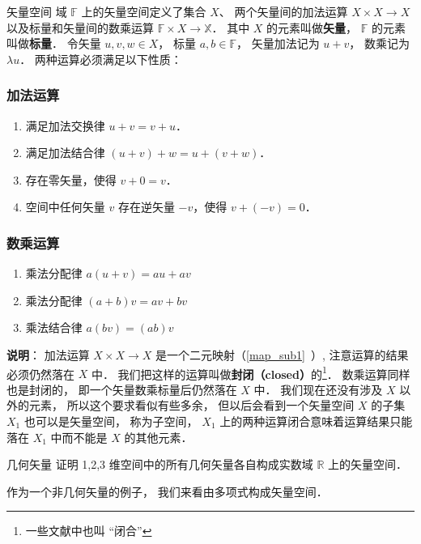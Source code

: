 \begin{definition}{矢量空间}
域 $\mathbb F$ 上的矢量空间定义了集合 $X$、 两个矢量间的加法运算 $X\times X \to X$ 以及标量和矢量间的数乘运算 $\mathbb F \times X \to \mathbb X$． 其中 $X$ 的元素叫做\textbf{矢量}， $\mathbb F$ 的元素叫做\textbf{标量}． 令矢量 $u,v,w \in X$， 标量 $a,b \in \mathbb F$， 矢量加法记为 $u + v$， 数乘记为 $\lambda u$． 两种运算必须满足以下性质：

\subsubsection{加法运算}
\begin{enumerate}
\item 满足加法交换律 $u + v = v + u$．
\item 满足加法结合律 $(u + v) + w = u + (v + w)$．
\item 存在零矢量，使得 $v + 0 = v$．
\item 空间中任何矢量 $v$ 存在逆矢量 $-v$，使得 $v + (-v) = 0$．
\end{enumerate}

\subsubsection{数乘运算}
\begin{enumerate}
\item 乘法分配律 $a(u + v) = au + av$ 
\item 乘法分配律 $(a + b)v = av + bv$
\item 乘法结合律 $a (b v) = (ab) v$
\end{enumerate}
\end{definition}

\textbf{说明}： 加法运算 $X \times X \to X$ 是一个二元映射（\autoref{map_sub1}~）, 注意运算的结果必须仍然落在 $X$ 中． 我们把这样的运算叫做\textbf{封闭（closed）}的\footnote{一些文献中也叫 “闭合”}． 数乘运算同样也是封闭的， 即一个矢量数乘标量后仍然落在 $X$ 中． 我们现在还没有涉及 $X$ 以外的元素， 所以这个要求看似有些多余， 但以后会看到一个矢量空间 $X$ 的子集 $X_1$ 也可以是矢量空间， 称为子空间， $X_1$ 上的两种运算闭合意味着运算结果只能落在 $X_1$ 中而不能是 $X$ 的其他元素．

\begin{exercise}{几何矢量}
证明 1,2,3 维空间中的所有几何矢量各自构成实数域 $\mathbb R$ 上的矢量空间．
\end{exercise}

作为一个非几何矢量的例子， 我们来看由多项式构成矢量空间．

